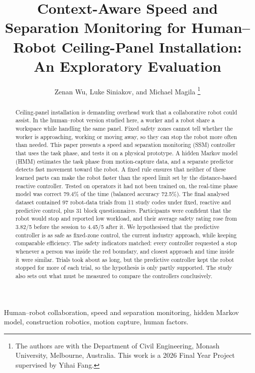 \documentclass{IEEEtran}
\begin{document}
\title{Context-Aware Speed and Separation Monitoring for Human--Robot
Ceiling-Panel Installation: An Exploratory Evaluation}
\author{Zenan Wu, Luke Siniakov, and Michael Magila%
\thanks{The authors are with the Department of Civil Engineering, Monash
University, Melbourne, Australia. This work is a 2026 Final Year Project
supervised by Yihai Fang.}%
}
\maketitle

\begin{abstract}
Ceiling-panel installation is demanding overhead work that a collaborative
robot could assist. In the human--robot version studied here, a worker and a
robot share a workspace while handling the same panel. Fixed safety zones cannot tell whether the worker is
approaching, working or moving away, so they can stop the robot more often than
needed. This paper presents a speed and separation monitoring (SSM) controller
that uses the task phase, and tests it on a physical prototype. A hidden Markov
model (HMM) estimates the task phase from motion-capture data, and a separate
predictor detects fast movement toward the robot. A fixed rule ensures that
neither of these learned parts can make the robot faster than the speed limit
set by the distance-based reactive controller. Tested on operators it had not been trained on,
the real-time phase model was correct 79.4\% of the time (balanced accuracy
72.5\%). The final analysed dataset contained 97 robot-data trials from 11 study codes
under fixed, reactive and predictive control, plus 31 block questionnaires.
Participants were confident that the robot would stop and reported low
workload, and their average safety rating rose from 3.82/5 before the session
to 4.45/5 after it. We hypothesised that the predictive controller is as
safe as fixed-zone control, the current industry approach, while keeping
comparable efficiency. The safety indicators matched: every controller
requested a stop whenever a person was inside the red boundary, and closest
approach and time inside it were similar. Trials took about as long, but the
predictive controller kept the robot stopped for more of each trial, so the
hypothesis is only partly supported. The study also sets out what must be measured to compare the controllers
conclusively.
\end{abstract}


\begin{IEEEkeywords}
Human--robot collaboration, speed and separation monitoring, hidden Markov model,
construction robotics, motion capture, human factors.
\end{IEEEkeywords}
\end{document}
